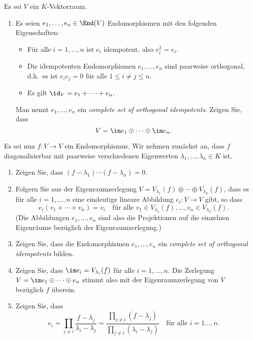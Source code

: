 \begin{question}
  Es sei $V$ ein $K$-Vektorraum.
  \begin{enumerate}[leftmargin=*]
    \item
      Es seien $e_1, \dotsc, e_n \in \End(V)$ Endomorphismen mit den folgenden Eigenschaften:
      \begin{itemize}
        \item
          Für alle $i = 1, \dotsc, n$ ist $e_i$ idempotent, also $e_i^2 = e_i$.
        \item
          Die idempotenten Endomorphismen $e_1, \dotsc, e_n$ sind paarweise orthogonal, d.h.\ es ist $e_i e_j = 0$ für alle $1 \leq i \neq j \leq n$.
        \item
          Es gilt $\id_V = e_1 + \dotsb + e_n$.
      \end{itemize}
      Man nennt $e_1, \dotsc, e_n$ ein \emph{complete set of orthogonal idempotents}.
      Zeigen Sie, dass
      \[
        V = \im e_1 \oplus \dotsb \oplus \im e_n.
      \]
  \end{enumerate}
  Es sei nun $f \colon V \to V$ ein Endomorphismus.
  Wir nehmen zunächst an, dass $f$ diagonalisierbar mit paarweise verschiedenen Eigenwerten $\lambda_1, \dotsc, \lambda_n \in K$ ist.
  \begin{enumerate}[resume]
    \item
      Zeigen Sie, dass $(f - \lambda_1) \dotsm (f - \lambda_n) = 0$.
    \item
      Folgern Sie aus der Eigenraumzerlegung $V = V_{\lambda_1}(f) \oplus \dotsb \oplus V_{\lambda_n}(f)$, dass es für alle $i = 1, \dotsc, n$ eine eindeutige lineare Abbildung $e_i \colon V \to V$ gibt, so dass
      \[
          e_i(v_1 + \dotsb + v_n)
        = v_i
        \quad
        \text{für alle $v_1 \in V_{\lambda_1}(f), \dotsc, v_n \in V_{\lambda_n}(f)$}.
      \]
      (Die Abbildungen $e_1, \dotsc, e_n$ sind also die Projektionen auf die einzelnen Eigenräume bezüglich der Eigenraumzerlegung.)
    \item
      Zeigen Sie, dass die Endomorphismen $e_1, \dotsc, e_n$ ein \emph{complete set of orthogonal idempotents} bilden.
    \item
      Zeigen Sie, dass $\im e_i = V_{\lambda_i}(f)$ für alle $i = 1, \dotsc, n$.
      Die Zerlegung $V = \im e_1 \oplus \dotsb \oplus e_n$ stimmt also mit der Eigenraumzerlegung von $V$ bezüglich $f$ überein.
    \item
      Zeigen Sie, dass
      \[
          e_i
        = \prod_{j \neq i} \frac{f - \lambda_j}{\lambda_i - \lambda_j}
        = \frac{\prod_{j \neq i} (f-\lambda_j)}{\prod_{j \neq i} (\lambda_i - \lambda_j)}
        \quad
        \text{für alle $i = 1 \dotsc, n$}.
      \]
      

\end{enumerate}
\end{question}
